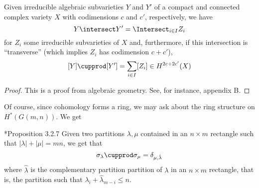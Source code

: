 \documentclass[11pt,leqno,oneside]{amsart}
\numberwithin{thm}{section}
\begin{document}
\begin{lem}
  Given irreducible algebraic subvarieties \(Y\) and
  \(Y'\) of a compact and connected complex variety \(X\) with
  codimensions \(c\) and \(c'\), respectively, we have \[
    Y \intersect Y' = \Intersect_{i \in I} Z_i
  \]
  for \(Z_i\) some irreducible subvarieties of \(X\) and, furthermore, 
  if this intersection is ``transverse'' (which implies \(Z_i\) has
  codimension \(c+c'\)), \[ 
    [Y] \cupprod [Y'] = \sum_{i \in I} [Z_i] \in H^{2c+2c'}(X)
  \]
\end{lem}
\begin{proof}
  This is a proof from algebraic geometry. See, for instance,
  \cite{fulton} appendix B. 
\end{proof}
Of course, since cohomology forms a
ring, we may ask about the ring 
structure on \(H^*(G(m,n))\). We get
\begin{prop}
  \cite{manivel}*{Proposition 3.2.7} Given two partitions \(\lambda,\mu\) contained in an \(n \times m\)
  rectangle such that \(|\lambda|+|\mu|=mn\), we get that \[
    \sigma_\lambda \cupprod \sigma_\mu = \delta_{\mu,\hat{\lambda}}
  \]
  where \(\hat{\lambda}\) is the complementary partition partition of
  \(\lambda\) in an \(n \times m\) rectangle, that is, the partition
  such that \(\lambda_i+\hat{\lambda}_{m-i} \leq n\). 
\end{prop}
\end{document}

